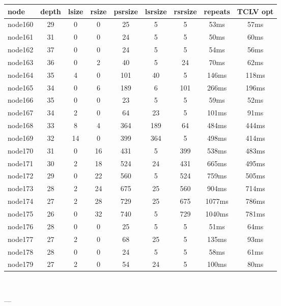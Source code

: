 \begin{tabular}{|l|c|c|c|c|c|c|c|c|}
\hline node & depth & lsize & rsize & psrsize & lsrsize & rsrsize   & repeats & TCLV opt\\
    \hline node160 & 29 & 0 & 0 & 25 & 5 & 5 & 53ms & 57ms\\
    \hline node161 & 31 & 0 & 0 & 24 & 5 & 5 & 50ms & 60ms\\
    \hline node162 & 37 & 0 & 0 & 24 & 5 & 5 & 54ms & 56ms\\
    \hline node163 & 36 & 0 & 2 & 40 & 5 & 24 & 70ms & 62ms\\
    \hline node164 & 35 & 4 & 0 & 101 & 40 & 5 & 146ms & 118ms\\
    \hline node165 & 34 & 0 & 6 & 189 & 6 & 101 & 266ms & 196ms\\
    \hline node166 & 35 & 0 & 0 & 23 & 5 & 5 & 59ms & 52ms\\
    \hline node167 & 34 & 2 & 0 & 64 & 23 & 5 & 101ms & 91ms\\
    \hline node168 & 33 & 8 & 4 & 364 & 189 & 64 & 484ms & 444ms\\
    \hline node169 & 32 & 14 & 0 & 399 & 364 & 5 & 498ms & 414ms\\
    \hline node170 & 31 & 0 & 16 & 431 & 5 & 399 & 538ms & 483ms\\
    \hline node171 & 30 & 2 & 18 & 524 & 24 & 431 & 665ms & 495ms\\
    \hline node172 & 29 & 0 & 22 & 560 & 5 & 524 & 759ms & 505ms\\
    \hline node173 & 28 & 2 & 24 & 675 & 25 & 560 & 904ms & 714ms\\
    \hline node174 & 27 & 2 & 28 & 729 & 25 & 675 & 1077ms & 786ms\\
    \hline node175 & 26 & 0 & 32 & 740 & 5 & 729 & 1040ms & 781ms\\
    \hline node176 & 28 & 0 & 0 & 25 & 5 & 5 & 51ms & 64ms\\
    \hline node177 & 27 & 2 & 0 & 68 & 25 & 5 & 135ms & 93ms\\
    \hline node178 & 28 & 0 & 0 & 24 & 5 & 5 & 58ms & 61ms\\
    \hline node179 & 27 & 2 & 0 & 54 & 24 & 5 & 100ms & 80ms\\

\hline
\end{tabular} \

---


